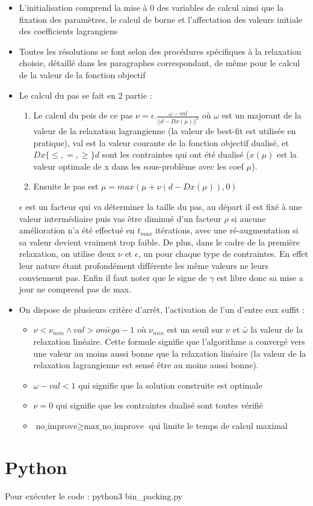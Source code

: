 \documentclass{article}
\begin{document}
\begin{itemize}
\item
L'initialisation comprend la mise à 0 des variables de calcul ainsi que la fixation des paramètres, le calcul de borne et l'affectation des valeurs initiale des coefficients lagrangiens
\item
Toutes les résolutions se font selon des procédures spécifiques à la relaxation choisie, détaillé dans les paragraphes correspondant, de même pour le calcul de la valeur de la fonction objectif
\item
Le calcul du pas se fait en 2 partie :
\begin{enumerate}[1 - ]
\item
Le calcul du pois de ce pas $\nu = \epsilon . \frac{\omega - val}{||d - Dx(\mu)||^2}$ où $\omega$ est un majorant de la valeur de la relaxation lagrangienne (la valeur de best-fit est utilisée en pratique), val est la valeur courante de la fonction objectif dualisé, et $Dx \{\leqslant, =, \geqslant\} d$ sont les contraintes qui ont été dualisé ($x(\mu)$ est la valeur optimale de x dans les sous-problème avec les coef $\mu$).
\item
Ensuite le pas est $\mu = max(\mu + \nu ( d - Dx(\mu)), 0)$
\end{enumerate}
$\epsilon$ est un facteur qui va déterminer la taille du pas, au départ il est fixé à une valeur intermédiaire puis vas être diminué d'un facteur $\rho$ si aucune amélioration n'a été effectué en $t_{max}$ itérations, avec une ré-augmentation si sa valeur devient vraiment trop faible. De plus, dans le cadre de la première relaxation, on utilise deux $\nu$ et $\epsilon$, un pour chaque type de contraintes. En effet leur nature étant profondément différente les même valeurs ne leurs conviennent pas. Enfin il faut noter que le signe de $\gamma$ est libre donc sa mise a jour ne comprend pas de max.
\item
On dispose de plusieurs critère d’arrêt, l'activation de l'un d'entre eux suffit :
\begin{itemize}
\item
$\nu < \nu_{min} \land val > \bar{omega} -1$ où $\nu_{min}$ est un seuil sur $\nu$ et $\bar{\omega}$ la valeur de la relaxation linéaire. Cette formule signifie que l'algorithme a convergé vers une valeur au moins aussi bonne que la relaxation linéaire (la valeur de la relaxation lagrangienne est sensé être au moins aussi bonne).
\item
$\omega - val < 1$ qui signifie que la solution construite est optimale
\item
$\nu = 0$ qui signifie que les contraintes dualisé sont toutes vérifié
\item
$\text{no\_improve} \geqslant \text{max\_no\_improve}$ qui limite le temps de calcul maximal
\end{itemize}
\end{itemize}

\section{Python}

Pour exécuter le code : python3 bin\_packing.py
\end{document}
